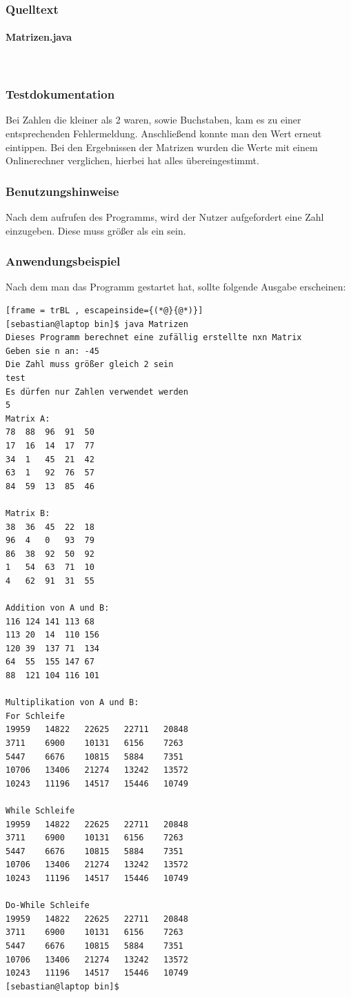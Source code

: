 \subsubsection{Quelltext}
\paragraph{Matrizen.java}\


\subsubsection{Testdokumentation}
Bei Zahlen die kleiner als 2 waren, sowie Buchstaben, kam es zu einer entsprechenden Fehlermeldung. Anschließend konnte man den Wert erneut eintippen.
Bei den Ergebnissen der Matrizen wurden die Werte mit einem Onlinerechner verglichen, hierbei hat
alles übereingestimmt.

\subsubsection{Benutzungshinweise}
Nach dem aufrufen des Programms, wird der Nutzer aufgefordert eine Zahl einzugeben.
Diese muss grö\ss er als ein sein.

\subsubsection{Anwendungsbeispiel}
Nach dem man das Programm gestartet hat, sollte folgende Ausgabe erscheinen:
\begin{lstlisting}[frame = trBL , escapeinside={(*@}{@*)}]
[sebastian@laptop bin]$ java Matrizen 
Dieses Programm berechnet eine zufällig erstellte nxn Matrix
Geben sie n an: -45
Die Zahl muss größer gleich 2 sein
test
Es dürfen nur Zahlen verwendet werden
5
Matrix A:
78	88	96	91	50	
17	16	14	17	77	
34	1	45	21	42	
63	1	92	76	57	
84	59	13	85	46	

Matrix B:
38	36	45	22	18	
96	4	0	93	79	
86	38	92	50	92	
1	54	63	71	10	
4	62	91	31	55	

Addition von A und B:
116	124	141	113	68	
113	20	14	110	156	
120	39	137	71	134	
64	55	155	147	67	
88	121	104	116	101	

Multiplikation von A und B:
For Schleife
19959	14822	22625	22711	20848	
3711	6900	10131	6156	7263	
5447	6676	10815	5884	7351	
10706	13406	21274	13242	13572	
10243	11196	14517	15446	10749	

While Schleife
19959	14822	22625	22711	20848	
3711	6900	10131	6156	7263	
5447	6676	10815	5884	7351	
10706	13406	21274	13242	13572	
10243	11196	14517	15446	10749	

Do-While Schleife
19959	14822	22625	22711	20848	
3711	6900	10131	6156	7263	
5447	6676	10815	5884	7351	
10706	13406	21274	13242	13572	
10243	11196	14517	15446	10749
[sebastian@laptop bin]$ 
\end{lstlisting}
